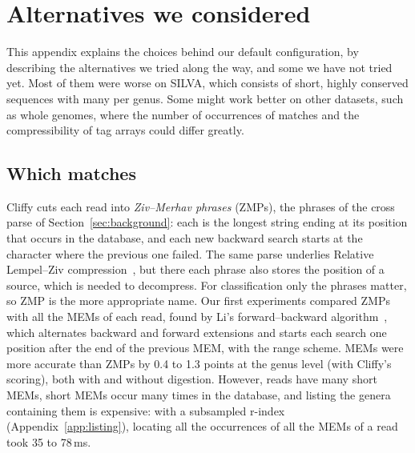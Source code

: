 \section{Alternatives we considered}
\label{app:alternatives}
\label{app:negative}

This appendix explains the choices behind our default configuration, by describing the alternatives we tried along the way, and some we have not tried yet.
Most of them were worse on SILVA, which consists of short, highly conserved sequences with many per genus.
Some might work better on other datasets, such as whole genomes, where the number of occurrences of matches and the compressibility of tag arrays could differ greatly.

\subsection{Which matches}
\label{app:matches}

Cliffy cuts each read into \emph{Ziv--Merhav phrases} (ZMPs), the phrases of the cross parse of Section~\ref{sec:background}: each is the longest string ending at its position that occurs in the database, and each new backward search starts at the character where the previous one failed.
The same parse underlies Relative Lempel--Ziv compression~\cite{KPZ10}, but there each phrase also stores the position of a source, which is needed to decompress.
For classification only the phrases matter, so ZMP is the more appropriate name.
Our first experiments compared ZMPs with all the MEMs of each read, found by Li's forward--backward algorithm~\cite{Li2012}, which alternates backward and forward extensions and starts each search one position after the end of the previous MEM, with the range scheme.
MEMs were more accurate than ZMPs by 0.4 to 1.3 points at the genus level (with Cliffy's scoring), both with and without digestion.
However, reads have many short MEMs, short MEMs occur many times in the database, and listing the genera containing them is expensive: with a subsampled r-index (Appendix~\ref{app:listing}), locating all the occurrences of all the MEMs of a read took 35 to 78\,ms.

